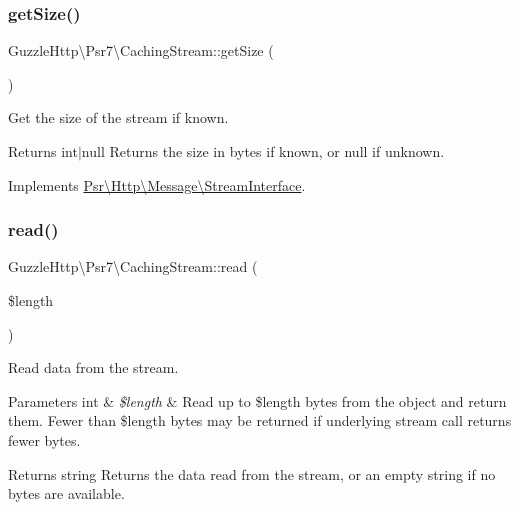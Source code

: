 \subsubsection{\texorpdfstring{get\+Size()}{getSize()}}
{\footnotesize\ttfamily Guzzle\+Http\textbackslash{}\+Psr7\textbackslash{}\+Caching\+Stream\+::get\+Size (\begin{DoxyParamCaption}{ }\end{DoxyParamCaption})}

Get the size of the stream if known.

\begin{DoxyReturn}{Returns}
int$\vert$null Returns the size in bytes if known, or null if unknown. 
\end{DoxyReturn}


Implements \hyperlink{interfacePsr_1_1Http_1_1Message_1_1StreamInterface_a85b9ff28e3ee39d95a47e623d866cf76}{Psr\textbackslash{}\+Http\textbackslash{}\+Message\textbackslash{}\+Stream\+Interface}.

\mbox{\label{classGuzzleHttp_1_1Psr7_1_1CachingStream_ae9f074ce44f716bcc5d5ef5e4357785b}} 
\subsubsection{\texorpdfstring{read()}{read()}}
{\footnotesize\ttfamily Guzzle\+Http\textbackslash{}\+Psr7\textbackslash{}\+Caching\+Stream\+::read (\begin{DoxyParamCaption}\item[{}]{\$length }\end{DoxyParamCaption})}

Read data from the stream.


\begin{DoxyParams}[1]{Parameters}
int & {\em \$length} & Read up to \$length bytes from the object and return them. Fewer than \$length bytes may be returned if underlying stream call returns fewer bytes. \\
\hline
\end{DoxyParams}
\begin{DoxyReturn}{Returns}
string Returns the data read from the stream, or an empty string if no bytes are available. 
\end{DoxyReturn}

